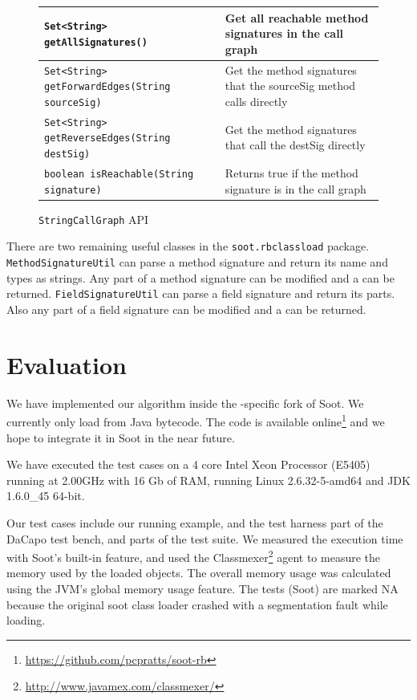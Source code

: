 \documentclass{sigplanconf}
\begin{document}
\begin{figure}[htbf]
\begin{tabularx}{\columnwidth}{|XX|}
\hline
{\tt Set<String> getAllSignatures()} & Get all reachable method 
    signatures in the call graph\\\hline 
{\tt Set<String> getForwardEdges(String sourceSig)} & Get the
    method signatures that the sourceSig method calls directly\\\hline  
{\tt Set<String> getReverseEdges(String destSig)} & Get the
    method signatures that call the destSig directly\\\hline
{\tt boolean isReachable(String signature)} & Returns true if the
    method signature is in the call graph\\\hline
\end{tabularx}
\caption{{\tt StringCallGraph} API}
\label{fig:scg}
\end{figure}

There are two remaining useful classes in the {\tt soot.\-rb\-class\-load} package. {\tt MethodSignatureUtil} can parse a method signature and return its name and types as strings. Any part of a method signature can be modified and a \sootmethod can be returned. {\tt FieldSignatureUtil} can parse a field signature and return its parts. Also any part of a field signature can be modified and a \sootfield can be returned.

\section{Evaluation}
\label{sec:eval}

We have implemented our algorithm inside the \rb{}-specific fork of Soot. We currently only load from Java bytecode. The code is available online\footnote{\url{https://github.com/pcpratts/soot-rb}} and we hope to integrate it in Soot in the near future.

We have executed the test cases on a 4 core Intel Xeon Processor (E5405) running at 2.00GHz with 16 Gb of RAM, running Linux 2.6.32-5-amd64 and JDK 1.6.0\_45 64-bit. 

Our test cases include our running example, and the test harness part of the DaCapo \cite{DaCapo:paper} test bench, and parts of the \rb test suite. We measured the execution time with Soot's built-in feature, and used the Classmexer\footnote{\url{http://www.javamex.com/classmexer/}} agent to measure the memory used by the loaded \sootclass objects. The overall memory usage was calculated using the JVM's global memory usage feature. The \rb tests (Soot) are marked NA because the original soot class loader crashed with a segmentation fault while loading.
\end{document}
